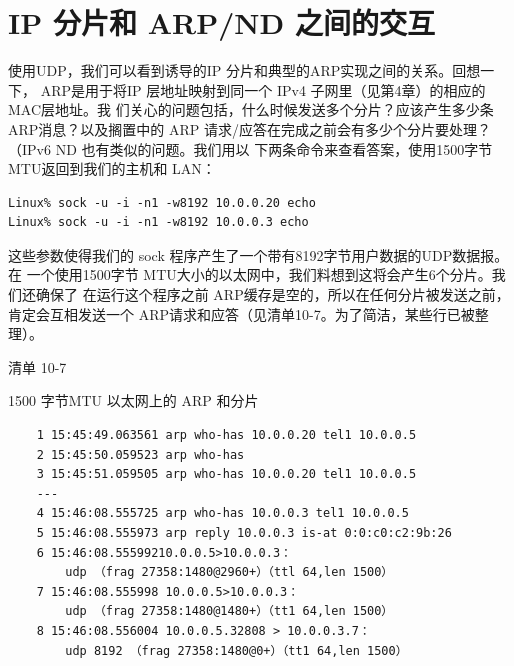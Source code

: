 \section{IP 分片和 ARP/ND 之间的交互}

使用UDP，我们可以看到诱导的IP 分片和典型的ARP实现之间的关系。回想一下，
ARP是用于将IP 层地址映射到同一个 IPv4 子网里（见第4章）的相应的MAC层地址。我
们关心的问题包括，什么时候发送多个分片？应该产生多少条ARP消息？以及搁置中的
ARP 请求/应答在完成之前会有多少个分片要处理？（IPv6 ND 也有类似的问题。我们用以
下两条命令来查看答案，使用1500字节 MTU返回到我们的主机和 LAN：

\begin{verbatim}
Linux% sock -u -i -n1 -w8192 10.0.0.20 echo
Linux% sock -u -i -n1 -w8192 10.0.0.3 echo
\end{verbatim}

这些参数使得我们的 sock 程序产生了一个带有8192字节用户数据的UDP数据报。在
一个使用1500字节 MTU大小的以太网中，我们料想到这将会产生6个分片。我们还确保了
在运行这个程序之前 ARP缓存是空的，所以在任何分片被发送之前，肯定会互相发送一个
ARP请求和应答（见清单10-7。为了简洁，某些行已被整理）。

清单 10-7

1500 字节MTU 以太网上的 ARP 和分片

\begin{verbatim}
    1 15:45:49.063561 arp who-has 10.0.0.20 tel1 10.0.0.5
    2 15:45:50.059523 arp who-has
    3 15:45:51.059505 arp who-has 10.0.0.20 tel1 10.0.0.5
    ---
    4 15:46:08.555725 arp who-has 10.0.0.3 tel1 10.0.0.5
    5 15:46:08.555973 arp reply 10.0.0.3 is-at 0:0:c0:c2:9b:26
    6 15:46:08.55599210.0.0.5>10.0.0.3：
        udp （frag 27358:1480@2960+）（ttl 64,len 1500）
    7 15:46:08.555998 10.0.0.5>10.0.0.3：
        udp （frag 27358:1480@1480+）（tt1 64,len 1500）
    8 15:46:08.556004 10.0.0.5.32808 > 10.0.0.3.7：
        udp 8192 （frag 27358:1480@0+）（tt1 64,len 1500）
\end{verbatim}


